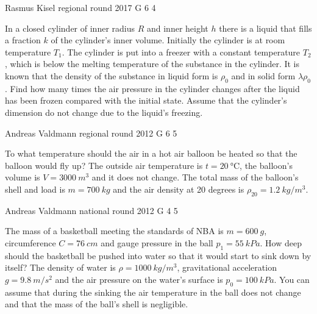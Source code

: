 \documentclass[11pt]{article}
\begin{document}
{Rasmus Kisel} %
{regional round} %
{2017} %
{G 6} %
{4} %
{

\ifEngStatement
In a closed cylinder of inner radius $R$ and inner height $h$ there is a liquid that fills a fraction $k$ of the cylinder's inner volume. Initially the cylinder is at room temperature $T_{1}$. The cylinder is put into a freezer with a constant temperature $T_{2}$, which is below the melting temperature of the substance in the cylinder. It is known that the density of the substance in liquid form is $\rho_0$ and in solid form $\lambda\rho_0$. Find how many times the air pressure in the cylinder changes after the liquid has been frozen compared with the initial state. Assume that the cylinder's dimension do not change due to the liquid’s freezing.
\fi
}

{Andreas Valdmann} %
{regional round} %
{2012} %
{G 6} %
{5} %
{

\ifEngStatement
To what temperature should the air in a hot air balloon be heated so that the balloon would fly up? The outside air temperature is $t=\SI{20}{\celsius}$, the balloon's volume is $V=\SI{3000}{m^3}$ and it does not change. The total mass of the balloon's shell and load is $m=\SI{700}{kg}$ and the air density at 20 degrees is $\rho_{20}=\SI{1,2}{kg/m^3}$.
\fi
}

{Andreas Valdmann} %
{national round} %
{2012} %
{G 4} %
{5} %
{

\ifEngStatement
The mass of a basketball meeting the standards of NBA is $m=\SI{600}{g}$, circumference $C=\SI{76}{cm}$ and gauge pressure in the ball $p_1=\SI{55}{kPa}$. How deep should the basketball be pushed into water so that it would start to sink down by itself? The density of water is $\rho=\SI{1000}{kg/m^3}$, gravitational acceleration $g=\SI{9,8}{m/s^2}$ and the air pressure on the water's surface is $p_0=\SI{100}{kPa}$. You can assume that during the sinking the air temperature in the ball does not change and that the mass of the ball’s shell is negligible.
\fi
}
\end{document}
